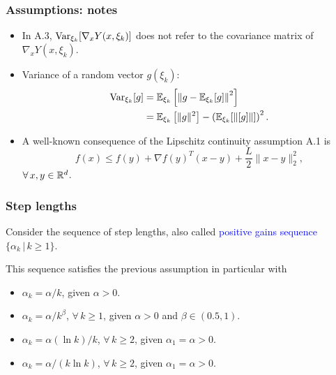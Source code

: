 \documentclass[usepdftitle=false, aspectratio=169]{beamer}
\begin{document}
\begin{frame}
\frametitle{Assumptions: notes}

\begin{itemize}
\item 
In A.3, $\operatorname{Var}_{\xi_k} [\nabla_x Y(x, \xi_k)]$ does not refer to the covariance matrix of $\nabla_x Y(x,  \xi_k)$.
\item
Variance of a random vector $g(\xi_k)$:
\begin{align*}
\operatorname{Var}_{\xi_k} [g] &= {\mathbb{E}}_{\xi_k} \left[ \left \| g - {\mathbb{E}}_{\xi_k} [g] \right \|^2 \right] \\
& = {\mathbb{E}}_{\xi_k} \left[ \| g \|^2 \right] - \left( {\mathbb{E}}_{\xi_k} [ \| [g] \| ] \right)^2.
\end{align*}
\item
A well-known consequence of the Lipschitz continuity assumption A.1 is
$$
f(x) \leq f(y) + \nabla f(y)^T ( x - y ) + \frac{L}{2} \| x - y \|^2_2,
$$
$\forall\, x, y \in {\mathbb{R}}^d$.
\end{itemize}

\end{frame}

\begin{frame}
\frametitle{Step lengths}

Consider the sequence of step lengths, also called \textcolor{blue}{positive gains sequence} $\{ \alpha_k \,|\, k \geq 1 \}$.

\mbox{}

This sequence satisfies the previous assumption in particular with
\begin{itemize}
\item 
$\alpha_k = \alpha/k$, given $\alpha > 0$.
\item 
$\alpha_k = \alpha/k^{\beta}$, $\forall\, k \geq 1$, given $\alpha > 0$ and $\beta \in (0.5, 1)$.
\item
$\alpha_k = \alpha(\ln k)/k$, $\forall\, k \geq 2$, given $\alpha_1 = \alpha > 0$.
\item
$\alpha_k = \alpha/(k \ln k)$, $\forall\, k \geq 2$, given $\alpha_1 = \alpha > 0$.
\end{itemize}

\end{frame}
\end{document}

